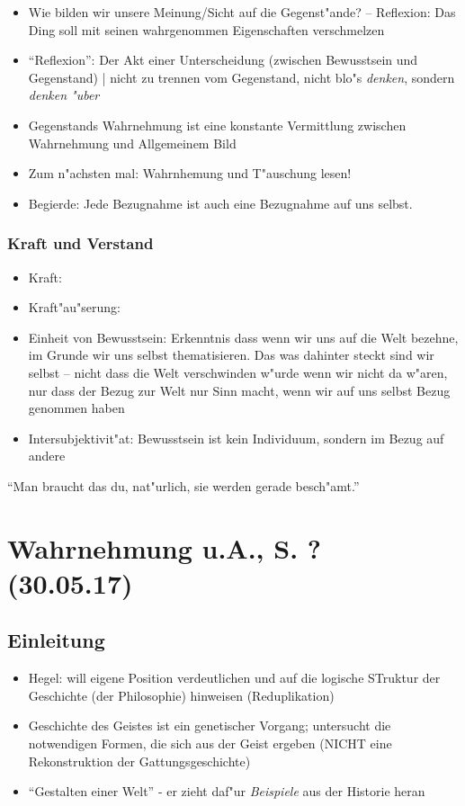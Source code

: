 \documentclass[emulatestandardclasses]{scrartcl}
\begin{document}
\begin{itemize}
  \item Wie bilden wir unsere Meinung/Sicht auf die Gegenst"ande? -- Reflexion: Das Ding soll mit seinen wahrgenommen Eigenschaften verschmelzen
  \item "`Reflexion"': Der Akt einer Unterscheidung (zwischen Bewusstsein und Gegenstand) | nicht zu trennen vom Gegenstand, nicht blo"s \emph{denken}, sondern \emph{denken "uber}
  \item Gegenstands Wahrnehmung ist eine konstante Vermittlung zwischen Wahrnehmung und Allgemeinem Bild
  \item Zum n"achsten mal: Wahrnhemung und T"auschung lesen!
  \item Begierde: Jede Bezugnahme ist auch eine Bezugnahme auf uns selbst.
\end{itemize}


\subsubsection{Kraft und Verstand}

\begin{itemize}
  \item Kraft: 
  \item Kraft"au"serung: 
  \item Einheit von Bewusstsein: Erkenntnis dass wenn wir uns auf die Welt bezehne, im Grunde wir uns selbst thematisieren. Das was dahinter steckt sind wir selbst -- nicht dass die Welt verschwinden w"urde wenn wir nicht da w"aren, nur dass der Bezug zur Welt nur Sinn macht, wenn wir auf uns selbst Bezug genommen haben
  \item Intersubjektivit"at: Bewusstsein ist kein Individuum, sondern im Bezug auf andere
\end{itemize}

"`Man braucht das du, nat"urlich, sie werden gerade besch"amt."'

\section{Wahrnehmung u.A., S. ?\\(30.05.17)}

\subsection{Einleitung}

\begin{itemize}
  \item Hegel: will eigene Position verdeutlichen und auf die logische STruktur der Geschichte (der Philosophie) hinweisen (Reduplikation)
  \item Geschichte des Geistes ist ein genetischer Vorgang; untersucht die notwendigen Formen, die sich aus der Geist ergeben (NICHT eine Rekonstruktion der Gattungsgeschichte)
  \item "`Gestalten einer Welt"' - er zieht daf"ur \emph{Beispiele} aus der Historie heran
\end{itemize}
\end{document}
